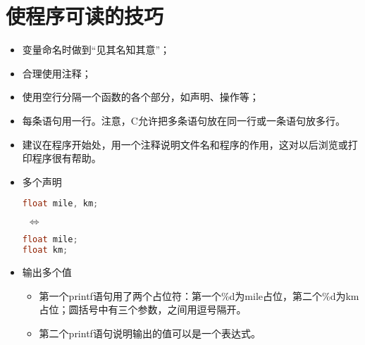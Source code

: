 \section{使程序可读的技巧}
\begin{frame}[fragile]\ft{\secname}
\begin{itemize}
\item 变量命名时做到“见其名知其意”；\\[0.1in]
\item 合理使用注释；\\[0.1in]
\item 使用空行分隔一个函数的各个部分，如声明、操作等；\\[0.1in]
\item 每条语句用一行。注意，C允许把多条语句放在同一行或一条语句放多行。
\end{itemize}
\end{frame}


\begin{frame}[fragile]\ft{\secname}

\end{frame}


\begin{frame}[fragile]\ft{\secname}
\begin{itemize}
	\item 建议在程序开始处，用一个注释说明文件名和程序的作用，这对以后浏览或打印程序很有帮助。\\[0.1in]
	\item 多个声明 \\[0.1in]
	
\begin{minipage}{.4\textwidth}
\begin{lstlisting}[language=c]
float mile, km;
\end{lstlisting}
\end{minipage}	$~~\Leftrightarrow~~$
\begin{minipage}{.4\textwidth}
\begin{lstlisting}[language=c]
float mile;
float km;
\end{lstlisting}
\end{minipage}

\item 输出多个值

\begin{itemize}
	\item 第一个printf语句用了两个占位符：第一个\%d为mile占位，第二个\%d为km占位；圆括号中有三个参数，之间用逗号隔开。\vspace{0.1in}
	\item 
	第二个printf语句说明输出的值可以是一个表达式。
\end{itemize}

\end{itemize}
 

\end{frame}
 